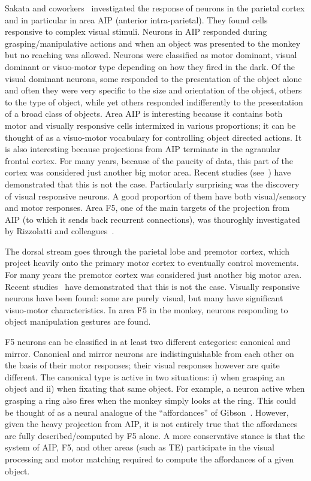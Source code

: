 Sakata and coworkers~\cite{sakata-taira-kusunoki-murata-tanaka-1997} 
investigated the response of neurons in the 
parietal cortex and in particular in area AIP (anterior intra-parietal). They found 
cells responsive to complex visual stimuli. Neurons in AIP responded during 
grasping/manipulative actions and when an object was presented to the 
monkey but no reaching was allowed. Neurons were classified as motor dominant, 
visual dominant or visuo-motor type depending on how they fired in the dark. Of 
the visual dominant neurons, some responded to the presentation of the 
object alone and often they were very specific to the size and orientation of the 
object, others to the type of object, while yet others responded indifferently to the 
presentation of a broad class of objects. Area AIP is interesting because 
it contains both motor and visually responsive cells intermixed in various proportions; 
it can be thought of as a visuo-motor vocabulary for controlling object directed 
actions. It is also interesting because projections from AIP terminate in the 
agranular frontal cortex. For many years, because of the paucity of data, this 
part of the cortex was considered just another big motor area. Recent studies 
(see~\cite{jeannerod97cognitive,fadiga00visuomotor}) have demonstrated 
that this is not the case. Particularly surprising was the discovery of visual 
responsive neurons. A good proportion of them have both visual/sensory and motor 
responses. Area F5, one of the main targets of the projection from AIP (to which 
it sends back recurrent connections), was thouroghly investigated by Rizzolatti 
and colleagues~\cite{gallese-fadiga-fogassi-rizzolatti-1996}.

%
%
\ifverbose
The dorsal stream goes through the parietal lobe and premotor cortex,
which project heavily onto the primary motor cortex to eventually
control movements. For many years the premotor cortex was considered
just another big motor area.  Recent studies~\cite{jeannerod97cognitive} have demonstrated that this is not the
case.  Visually responsive neurons have been found: some are purely
visual, but many have significant visuo-motor characteristics. In area
F5 in the monkey, neurons responding to object manipulation gestures
are found.  
\fi

F5 neurons can be classified in at least two different categories:
canonical and mirror. Canonical and mirror neurons are 
indistinguishable from each other on the basis of their motor responses; 
their visual responses however are quite different. 
The canonical type is active in two situations:
i) when grasping an object and ii) when fixating that same object.
For example, a neuron active when grasping a ring also fires when the
monkey simply looks at the ring.  This could be thought of as a neural
analogue of the ``affordances'' of Gibson~\cite{gibson77theory}. 
However, given the heavy projection from AIP, it is not entirely
true that the affordances are fully described/computed by F5 alone.
A more conservative stance is that the system of AIP, F5, and other areas 
(such as TE) participate in the visual processing and motor matching required 
to compute the affordances of a given object.  

